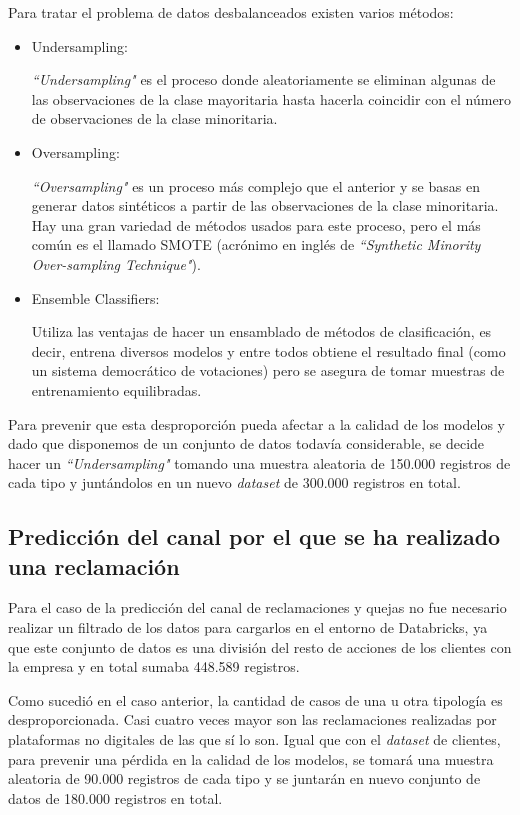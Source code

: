 Para tratar el problema de datos desbalanceados existen varios métodos:
\begin{itemize}
    \item Undersampling:
    
    \textit{``Undersampling"} es el proceso donde aleatoriamente se eliminan algunas de las observaciones de la clase mayoritaria hasta hacerla coincidir con el número de observaciones de la clase minoritaria.
    
    \item Oversampling:
    
    \textit{``Oversampling"} es un proceso más complejo que el anterior y se basas en generar datos sintéticos a partir de las observaciones de la clase minoritaria.
    Hay una gran variedad de métodos usados para este proceso, pero el más común es el llamado SMOTE (acrónimo en inglés de \textit{``Synthetic Minority Over-sampling Technique"}).

    \item Ensemble Classifiers:
    
    Utiliza las ventajas de hacer un ensamblado de métodos de clasificación, es decir, entrena diversos modelos y entre todos obtiene el resultado final (como un sistema democrático de votaciones) pero se asegura de tomar muestras de entrenamiento equilibradas.
    
\end{itemize}

Para prevenir que esta desproporción pueda afectar a la calidad de los modelos y dado que disponemos de un conjunto de datos todavía considerable, se decide hacer un \textit{``Undersampling"} tomando una muestra aleatoria de 150.000 registros de cada tipo y juntándolos en un nuevo \textit{dataset} de 300.000 registros en total.


\subsection{Predicción del canal por el que se ha realizado una reclamación}

Para el caso de la predicción del canal de reclamaciones y quejas no fue necesario realizar un filtrado de los datos para cargarlos en el entorno de Databricks, ya que este conjunto de datos es una división del resto de acciones de los clientes con la empresa y en total sumaba 448.589 registros.

Como sucedió en el caso anterior, la cantidad de casos de una u otra tipología es desproporcionada. Casi cuatro veces mayor son las reclamaciones realizadas por plataformas no digitales de las que sí lo son.
Igual que con el \textit{dataset} de clientes, para prevenir una pérdida en la calidad de los modelos, se tomará una muestra aleatoria de 90.000 registros de cada tipo y se juntarán en nuevo conjunto de datos de 180.000 registros en total.

